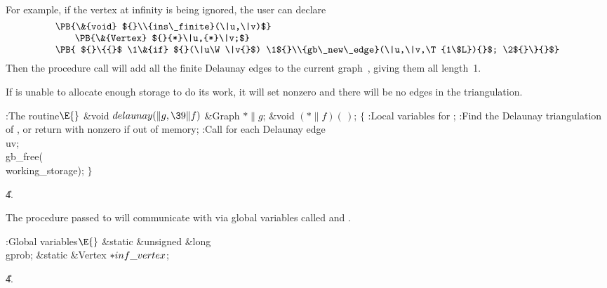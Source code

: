For example, if the vertex at infinity is being ignored, the user can
declare
$$\vcenter{\halign{#\hfil\cr
\PB{\&{void} ${}\\{ins\_finite}(\|u,\|v)$}\cr
\qquad\PB{\&{Vertex} ${}{*}\|u,{*}\|v;$}\cr
\PB{ ${}\{{}$ \1\&{if} ${}(\|u\W\|v{}$) \1${}\\{gb\_new\_edge}(\|u,\|v,\T{1%
\$L}){}$; \2${}\}{}$}\cr}}$$
Then the procedure call  will add all
the finite
Delaunay edges to the current graph~, giving them all length~1.

If  is unable to allocate enough storage to do its work, it
will set  nonzero and there will be no edges in
the triangulation.

\Y\B\4:The  routine\X${}\E{}$\6
\1\1\&{void} ${}\\{delaunay}(\|g,\39\|f){}$\6
\&{Graph} ${}{*}\|g{}$;\6
\&{void} ${}({*}\|f)(\,){}$;%
\2\2\6
${}\{{}$\5
\1:Local variables for \X;\7
:Find the Delaunay triangulation of , or return with  nonzero if out of memory\X;\6
:Call  for each Delaunay edge \\{uv}\X;\6
\\{gb\_free}(\\{working\_storage});\6
\4${}\}{}$\2\par
\U4.\fi

The procedure passed to  will communicate with  via
global variables called  and .

\Y\B\4:Global variables\X${}\E{}$\6
\&{static} \&{unsigned} \&{long} \\{gprob};\6
\&{static} \&{Vertex} ${}{*}\\{inf\_vertex}{}$;\par
\U4.\fi

